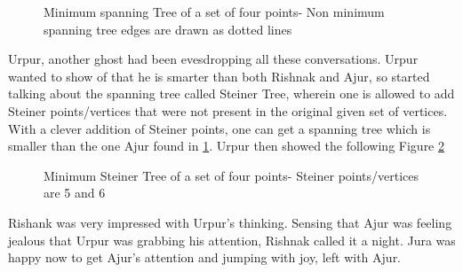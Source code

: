 \begin{figure}
\begin{center}
\caption{ Minimum spanning Tree of a set of four points- Non minimum spanning tree edges are drawn as dotted lines}\label{11g9}
\end{center}
\end{figure}

Urpur, another ghost had been evesdropping all these conversations. Urpur wanted to show of that he is smarter than both Rishnak and Ajur, so started talking about the spanning tree called Steiner Tree, wherein one is allowed to add Steiner points/vertices that were not present in the original given set of vertices. With a clever addition of Steiner points, one can get a spanning tree which is smaller than the one Ajur found in \ref{11g9}. Urpur then showed the following Figure \ref{11g10}

\begin{figure}
\begin{center}
\caption{ Minimum Steiner Tree of a set of four points- Steiner points/vertices are 5 and 6}\label{11g10}
\end{center}
\end{figure}

Rishank was very impressed with Urpur's thinking. Sensing that Ajur was feeling jealous that Urpur was grabbing his attention, Rishnak called it a night. Jura was happy now to get Ajur's attention and jumping with joy, left with Ajur.